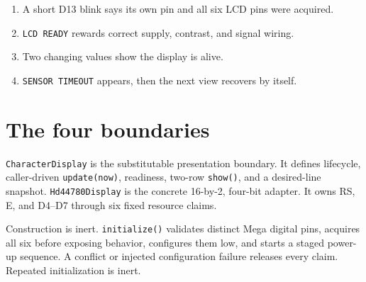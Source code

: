 \documentclass[11pt]{article}
\begin{document}
\begin{enumerate}
  \item A short D13 blink says its own pin and all six LCD pins were acquired.
  \item \texttt{LCD READY} rewards correct supply, contrast, and signal wiring.
  \item Two changing values show the display is alive.
  \item \texttt{SENSOR TIMEOUT} appears, then the next view recovers by itself.
\end{enumerate}

\section{The four boundaries}

\begin{center}
\end{center}

\texttt{CharacterDisplay} is the substitutable presentation boundary. It
defines lifecycle, caller-driven \texttt{update(now)}, readiness, two-row
\texttt{show()}, and a desired-line snapshot. \texttt{Hd44780Display} is the
concrete 16-by-2, four-bit adapter. It owns RS, E, and D4--D7 through six fixed
resource claims.

Construction is inert. \texttt{initialize()} validates distinct Mega digital
pins, acquires all six before exposing behavior, configures them low, and
starts a staged power-up sequence. A conflict or injected configuration
failure releases every claim. Repeated initialization is inert.
\end{document}

